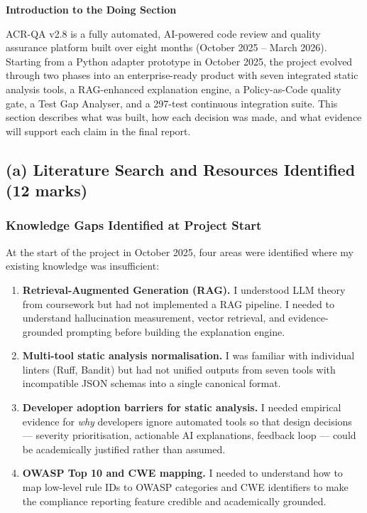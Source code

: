 \documentclass[12pt,a4paper]{article}
\begin{document}
\bigskip

\noindent\textbf{Introduction to the Doing Section}

ACR-QA v2.8 is a fully automated, AI-powered code review and quality assurance
platform built over eight months (October 2025 -- March 2026).  Starting from a
Python adapter prototype in October 2025, the project evolved through two phases
into an enterprise-ready product with seven integrated static analysis tools, a
RAG-enhanced explanation engine, a Policy-as-Code quality gate, a Test Gap
Analyser, and a 297-test continuous integration suite.  This section describes what
was built, how each decision was made, and what evidence will support each claim in
the final report.

\subsection{(a) Literature Search and Resources Identified (12 marks)}

\subsubsection{Knowledge Gaps Identified at Project Start}

At the start of the project in October 2025, four areas were identified where my
existing knowledge was insufficient:

\begin{enumerate}[leftmargin=1.5em]
  \item \textbf{Retrieval-Augmented Generation (RAG).}  I understood LLM theory
  from coursework but had not implemented a RAG pipeline.  I needed to understand
  hallucination measurement, vector retrieval, and evidence-grounded prompting
  before building the explanation engine.

  \item \textbf{Multi-tool static analysis normalisation.}  I was familiar with
  individual linters (Ruff, Bandit) but had not unified outputs from seven tools
  with incompatible JSON schemas into a single canonical format.

  \item \textbf{Developer adoption barriers for static analysis.}  I needed
  empirical evidence for \emph{why} developers ignore automated tools so that design
  decisions --- severity prioritisation, actionable AI explanations, feedback loop
  --- could be academically justified rather than assumed.

  \item \textbf{OWASP Top 10 and CWE mapping.}  I needed to understand how to map
  low-level rule IDs to OWASP categories and CWE identifiers to make the compliance
  reporting feature credible and academically grounded.
\end{enumerate}
\end{document}
